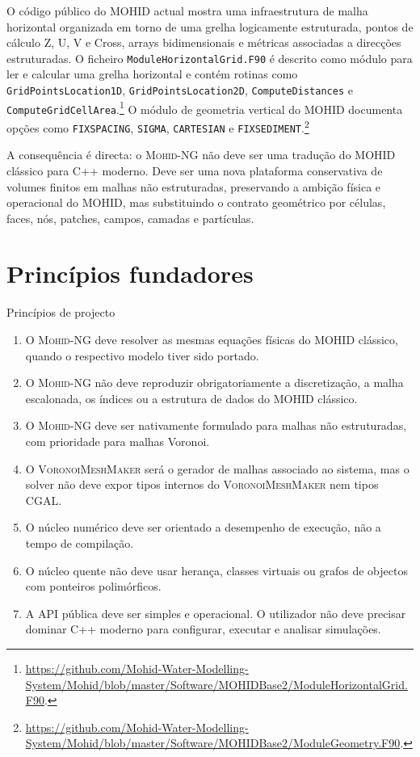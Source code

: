 \documentclass[11pt,a4paper]{article}
\newcommand{\mohidng}{\textsc{Mohid-NG}}
\newcommand{\vmm}{\textsc{VoronoiMeshMaker}}
\begin{document}
O código público do MOHID actual mostra uma infraestrutura de malha horizontal organizada em torno de uma grelha logicamente estruturada, pontos de cálculo Z, U, V e Cross, arrays bidimensionais e métricas associadas a direcções estruturadas. O ficheiro \texttt{ModuleHorizontalGrid.F90} é descrito como módulo para ler e calcular uma grelha horizontal e contém rotinas como \texttt{GridPointsLocation1D}, \texttt{GridPointsLocation2D}, \texttt{ComputeDistances} e \texttt{ComputeGridCellArea}.\footnote{\url{https://github.com/Mohid-Water-Modelling-System/Mohid/blob/master/Software/MOHIDBase2/ModuleHorizontalGrid.F90}.} O módulo de geometria vertical do MOHID documenta opções como \texttt{FIXSPACING}, \texttt{SIGMA}, \texttt{CARTESIAN} e \texttt{FIXSEDIMENT}.\footnote{\url{https://github.com/Mohid-Water-Modelling-System/Mohid/blob/master/Software/MOHIDBase2/ModuleGeometry.F90}.}

A consequência é directa: o \mohidng{} não deve ser uma tradução do MOHID clássico para C++ moderno. Deve ser uma nova plataforma conservativa de volumes finitos em malhas não estruturadas, preservando a ambição física e operacional do MOHID, mas substituindo o contrato geométrico por células, faces, nós, patches, campos, camadas e partículas.

\section{Princípios fundadores}

\begin{decisionbox}{Princípios de projecto}
\begin{enumerate}
\item O \mohidng{} deve resolver as mesmas equações físicas do MOHID clássico, quando o respectivo modelo tiver sido portado.
\item O \mohidng{} não deve reproduzir obrigatoriamente a discretização, a malha escalonada, os índices ou a estrutura de dados do MOHID clássico.
\item O \mohidng{} deve ser nativamente formulado para malhas não estruturadas, com prioridade para malhas Voronoi.
\item O \vmm{} será o gerador de malhas associado ao sistema, mas o solver não deve expor tipos internos do \vmm{} nem tipos CGAL.
\item O núcleo numérico deve ser orientado a desempenho de execução, não a tempo de compilação.
\item O núcleo quente não deve usar herança, classes virtuais ou grafos de objectos com ponteiros polimórficos.
\item A API pública deve ser simples e operacional. O utilizador não deve precisar dominar C++ moderno para configurar, executar e analisar simulações.
\end{enumerate}
\end{decisionbox}
\end{document}
